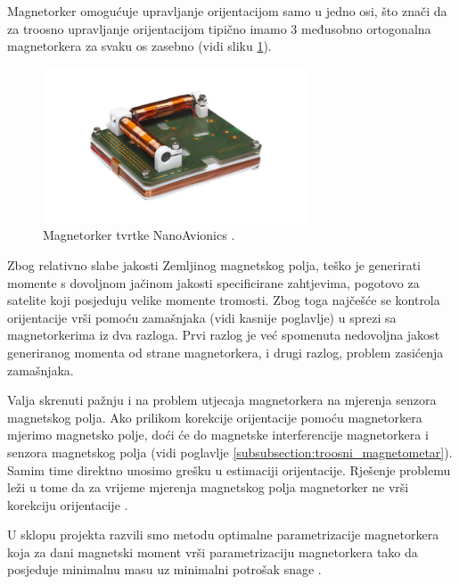 \documentclass[times, utf8, diplomski, numeric]{templates/template}
\begin{document}
{{{{                Magnetorker omogućuje upravljanje orijentacijom samo u jedno osi, što znači da za troosno upravljanje orijentacijom tipično imamo 3 međusobno ortogonalna magnetorkera za svaku os zasebno (vidi sliku \ref{fig:magnetorquer_img}).

                \begin{figure}[htb]
                \centering
                \includegraphics[width=0.7\textwidth]{images/magnetorquer_img.jpg}
                \caption{Magnetorker tvrtke NanoAvionics \cite{magnetorquer_cite}.}
                \label{fig:magnetorquer_img}
                \end{figure}

                Zbog relativno slabe jakosti Zemljinog magnetskog polja, teško je generirati momente s dovoljnom jačinom jakosti specificirane zahtjevima, pogotovo za satelite koji posjeduju velike momente tromosti. Zbog toga najčešće se kontrola orijentacije vrši pomoću zamašnjaka (vidi kasnije poglavlje) u sprezi sa magnetorkerima iz dva razloga. Prvi razlog je već spomenuta nedovoljna jakost generiranog momenta od strane magnetorkera, i drugi razlog, problem zasićenja zamašnjaka.

                Valja skrenuti pažnju i na problem utjecaja magnetorkera na mjerenja senzora magnetskog polja. Ako prilikom korekcije orijentacije pomoću magnetorkera mjerimo magnetsko polje, doći će do magnetske interferencije magnetorkera i senzora magnetskog polja (vidi poglavlje \ref{subsubsection:troosni_magnetometar}). Samim time direktno unosimo grešku u estimaciji orijentacije. Rješenje problemu leži u tome da za vrijeme mjerenja magnetskog polja magnetorker ne vrši korekciju orijentacije \cite{adcsKnjiga}.

                U sklopu projekta razvili smo metodu optimalne parametrizacije magnetorkera koja za dani magnetski moment vrši parametrizaciju magnetorkera tako da posjeduje minimalnu masu uz minimalni potrošak snage \cite{magnetorker_ieee}.
            }

}}}
\end{document}

